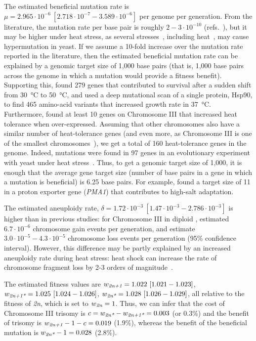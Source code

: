 \documentclass[12pt]{extarticle}
\newcommand{\euwt}{\emph{2n}}
\newcommand{\anwt}{\emph{2n+1}}
\newcommand{\eumt}{\emph{2n*}}
\newcommand{\anmt}{\emph{2n+1*}}
\begin{document}
The estimated beneficial mutation rate is $\mu=2.965\cdot10^{-6}\ [2.718\cdot10^{-7}-3.589\cdot10^{-6}]$ per genome per generation.
From the literature, the mutation rate per base pair is roughly $2-3\cdot10^{-10}$ (refs.~\citep{Zhu2014,Lynch2008}), but it may be higher under heat stress, as several stresses~\citep{Heidenreich2007}, including heat~\citep{Huang2018}, may cause hypermutation in yeast.
If we assume a 10-fold increase over the mutation rate reported in the literature, then the estimated beneficial mutation rate can be explained by a genomic target size of 1,000 base pairs (that is, 1,000 base pairs across the genome in which a mutation would provide a fitness benefit).
Supporting this, \citet{Jarolim2013} found 279 genes that contributed to survival after a sudden shift from \SI{30}{\celsius} to \SI{50}{\celsius}, and \citet{Flynn2020} used a deep mutational scan of a single protein, Hsp90, to find 465 amino-acid variants that increased growth rate in \SI{37}{\celsius}.
Furthermore, \citet{Yona2012} found at least 10 genes on Chromosome III that increased heat tolerance when over-expressed.
Assuming that other chromosomes also have a similar number of heat-tolerance genes (and even more, as Chromosome III is one of the smallest chromosomes~\citep{Gilchrist2019}), we get a total of 160 heat-tolerance genes in the genome.
Indeed, mutations were found in 97 genes in an evolutionary experiment with yeast under heat stress~\citep{Huang2018}.
Thus, to get a genomic target size of 1,000, it is enough that the average gene target size (number of base pairs in a gene in which a mutation is beneficial) is 6.25 base pairs. For example, \citet{Kohn2014} found a target size of 11 in a proton exporter gene (\emph{PMA1}) that contributes to high-salt adaptation.

The estimated aneuploidy rate, $\delta=1.72\cdot10^{-3}\ [1.47\cdot10^{-3}-2.786\cdot10^{-3}]$ is higher than in previous studies: for Chromosome III in diploid \yeast, \citet{Zhu2014} estimated $6.7\cdot10^{-6}$ chromosome gain events per generation, and \citet{Kumaran2013} estimate $3.0\cdot10^{-5}-4.3\cdot10^{-5}$ chromosome loss events per generation (95\% confidence interval). 
However, this difference may be partly explained by an increased aneuploidy rate during heat stress: heat shock can increase the rate of chromosome fragment loss by 2-3 orders of magnitude~\citep{Chen2012a}.

The estimated fitness values are $w_{\anwt}=1.022\ [1.021-1.023]$,
$w_{\anmt}=1.025\ [1.024-1.026]$,
$w_{\eumt}=1.028\ [1.026-1.029]$, all relative to the fitness of \euwt, which is set to $w_{\euwt}=1$. 
Thus, we can infer that the cost of Chromosome III trisomy is $c = w_{\eumt}-w_{\anmt} = 0.003$ (or 0.3\%) and the benefit of trisomy is $w_{\anwt}-1-c=0.019$ (1.9\%), whereas the benefit of the beneficial mutation is $w_{\eumt}-1=0.028$ (2.8\%).
\end{document}
